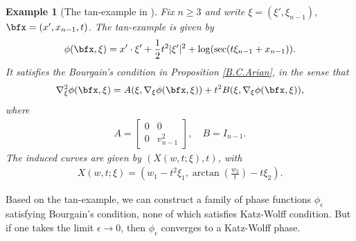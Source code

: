 \documentclass{article}
\numberwithin{equation}{section}
\theoremstyle{plain}
\newtheorem{example}[theorem]{Example}
\begin{document}
\begin{example}[The tan-example in \cite{nadjimzadah2026bourgainsconditionstickykakeya}]
    Fix $n\ge 3$ and write $\xi=(\xi',\xi_{n-1})$, $\bfx=(x',x_{n-1},t)$. The tan-example is given by 
    \begin{align}
        \phi(\bfx,\xi)=x'\cdot\xi'+\frac12 t^2|\xi'|^2+ \log(\sec (t\xi_{n-1}+ x_{n-1})).
    \end{align}
    It satisfies the Bourgain's condition in Proposition \ref{B.C.Arian}, in the sense that
    \begin{align}
        \nabla_\xi^2\phi(\bfx,\xi)= A(\xi,\nabla_\xi\phi(\bfx,\xi))+ t^2 B(\xi,\nabla_\xi\phi(\bfx,\xi)),
    \end{align}
    where 
    \begin{align}
    A=\begin{bmatrix}
        0 & 0\\
        0 & v_{n-1}^2
    \end{bmatrix},\quad
    B= I_{n-1}.
\end{align}
The induced curves are given by $(X(w,t;\xi),t)$, with
\begin{align}\label{260604le2-33}
    X(w,t;\xi)= \left(w_1-t^2\xi_1,\arctan\left(\frac{w_2}{t}\right)-t\xi_2\right).
\end{align}
\end{example}


Based on the tan-example, we can construct a family of phase functions $\phi_\epsilon$ satisfying Bourgain's condition, none of which satisfies Katz-Wolff condition. But if one takes the limit $\epsilon\to 0$, then $\phi_\epsilon$ converges to a Katz-Wolff phase.
\end{document}
